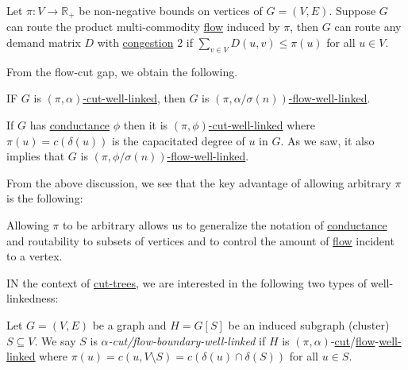\begin{claim}
	Let \(\pi \colon V \to \mathbb{R} _{+}\) be non-negative bounds on vertices of \(G = (V, E)\). Suppose \(G\) can route the product multi-commodity \hyperref[def:flow]{flow} induced by \(\pi \), then \(G\) can route any demand matrix \(D\) with \hyperref[def:congestion]{congestion} \(2\) if \(\sum_{v \in V} D(u, v) \leq \pi (u)\) for all \(u \in V\).
\end{claim}

From the flow-cut gap, we obtain the following.

\begin{claim}
	IF \(G\) is \hyperref[def:cut-well-linked]{\((\pi , \alpha )\)-cut-well-linked}, then \(G\) is \hyperref[def:flow-well-linked]{\((\pi , \alpha / \sigma (n))\)-flow-well-linked}.
\end{claim}

\begin{note}
	If \(G\) has \hyperref[def:conductance]{conductance} \(\phi \) then it is \hyperref[def:cut-well-linked]{\((\pi , \phi )\)-cut-well-linked} where \(\pi (u) = c(\delta (u))\) is the capacitated degree of \(u\) in \(G\). As we saw, it also implies that \(G\) is \hyperref[def:flow-well-linked]{\((\pi , \phi / \sigma (n))\)-flow-well-linked}.
\end{note}

From the above discussion, we see that the key advantage of allowing arbitrary \(\pi \) is the following:

\begin{intuition}
	Allowing \(\pi \) to be arbitrary allows us to generalize the notation of \hyperref[def:conductance]{conductance} and routability to subsets of vertices and to control the amount of \hyperref[def:flow]{flow} incident to a vertex.
\end{intuition}

IN the context of \hyperref[def:cut-tree]{cut-trees}, we are interested in the following two types of well-linkedness:

\begin{definition}\label{def:boundary-well-linked}
	Let \(G = (V, E)\) be a graph and \(H = G[S]\) be an induced subgraph (cluster) \(S \subseteq V\). We say \(S\) is \emph{\(\alpha \)-cut/flow-boundary-well-linked} if \(H\) is \((\pi , \alpha )\)-\hyperref[def:cut-well-linked]{cut}/\hyperref[def:flow-well-linked]{flow}-\hyperref[def:cut-flow-well-linked]{well-linked} where \(\pi (u) = c(u, V\setminus S) = c(\delta (u) \cap \delta (S))\) for all \(u \in S\).
\end{definition}


